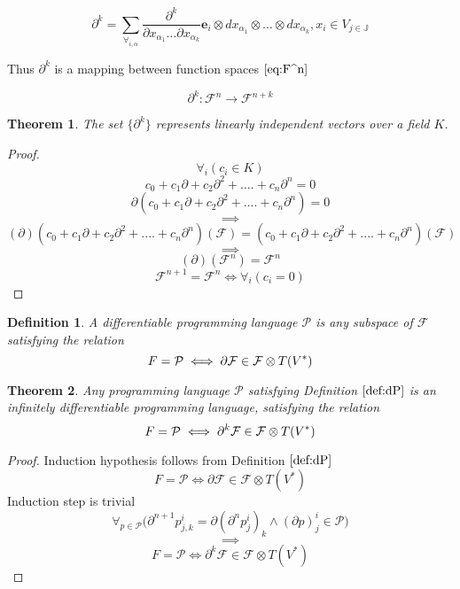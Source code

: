 \documentclass{article}
\newcommand{\JJ}{\mathbb{J}}
\newcommand{\e}{\mathbf{e}}
\newcommand{\F}{\mathcal{F}}
\newcommand{\dP}{\mathcal{P}}
\newcommand{\D}{\partial}
\newtheorem{definicija}{Definition}[section]
\newtheorem{izrek}{Theorem}[section]
\begin{document}
\begin{equation}\label{eq:dd}
	\partial^k=\sum_{\forall_{i,\alpha}}\frac{\partial^k}{\partial
	    x_{\alpha_1}\ldots \partial x_{\alpha_k}}\e_i\otimes
	  dx_{\alpha_1}\otimes\ldots \otimes dx_{\alpha_k} , x_i\in V_{j\in\JJ}
\end{equation}

Thus $\D^k$ is a mapping between function spaces $\eqref{eq:F^n}$
 
 \begin{equation}\label{eq:toFn+k}
 \D^k:\F^n\to\F^{n+k}
 \end{equation}
 
 \begin{izrek}\label{izr:linearnaNeodvisnost}
  The set $\{\partial^k\}$ represents linearly independent vectors over a field $K$.
 \end{izrek}
 
 \begin{proof} 
 $$\forall_i(c_i\in K)$$
	  $$c_0+c_1\D+c_2\D^2+....+c_n\D^n=0$$
	$$\D(c_0+c_1\D+c_2\D^2+....+c_n\D^n)=0$$
	$$\implies$$
	$$(\D)(c_0+c_1\D+c_2\D^2+....+c_n\D^n)(\F)=(c_0+c_1\D+c_2\D^2+....+c_n\D^n)(\F)$$
	$$\implies$$
	$$(\D)(\F^n)=\F^n$$
	$$\F^{n+1}=\F^n\iff\forall_i(c_i=0)$$
	
 \end{proof}
 
 \begin{definicija}\label{def:dP}
 	A differentiable programming language $\dP$ is any subspace of $\F$ satisfying the relation
 	\begin{equation}\label{eq:P}
 		\\F=\dP\iff\D\F\in\F\otimes T(V^*)
 	\end{equation}
 \end{definicija}

\begin{izrek}\label{izr:P}
	Any programming language $\dP$ satisfying Definition $\ref{def:dP}$ is an infinitely differentiable programming language, satisfying the relation
	\begin{equation}\label{eq:P_n}
	 		\\F=\dP\iff\D^k\F\in\F\otimes T(V^*)
	 	\end{equation}
\end{izrek}
\begin{proof} Induction hypothesis follows from Definition $\ref{def:dP}$
	$$F=\dP\iff\D\F\in\F\otimes T(V^*)$$
	Induction step is trivial
	\begin{equation}\label{eq:inductionStep}
	\forall_{p\in\dP}\Big(\D^{n+1}p^i_{j,k}=\D(\D^n p^i_j)_k\land(\D p)^i_j\in\dP\Big)
	\end{equation}
	$$\implies$$
	$$F=\dP\iff\D^k\F\in\F\otimes T(V^*)$$
\end{proof}
\end{document}
